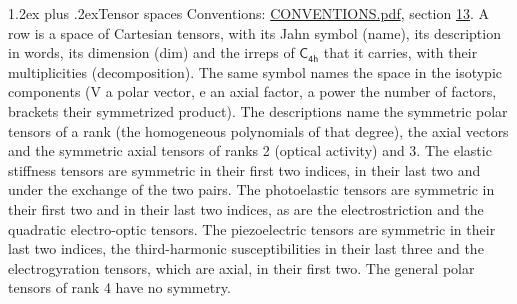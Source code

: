 \documentclass[10pt,a4paper]{article}
\makeatletter
\renewcommand\section{\@startsection{section}{1}{\z@}{-3ex plus -1ex minus -.2ex}%
  {1.2ex plus .2ex}{\normalfont\large\sffamily\bfseries\color{parttitle}}}
\numberwithin{equation}{section}
\newcommand{\grp}[1]{\mathsf{#1}}
\makeatother
\begin{document}
\section{Tensor spaces}\label{s:tensor_spaces}
Conventions: \href{../../CONVENTIONS.pdf}{CONVENTIONS.pdf}, section \href{../../CONVENTIONS.pdf\#conv.13}{13}.
\leavevmode\label{n:head.name}\label{n:head.description}\label{n:head.dim}\label{n:head.decomposition}A row is a space of Cartesian tensors, with its Jahn symbol (name), its description in words, its dimension (dim) and the irreps of $\grp{C_{4h}}$ that it carries, with their multiplicities (decomposition). \label{n:label.jahn}The same symbol names the space in the isotypic components (V a polar vector, e an axial factor, a power the number of factors, brackets their symmetrized product). The descriptions name the symmetric polar tensors of a rank (the homogeneous polynomials of that degree), the axial vectors and the symmetric axial tensors of ranks 2 (optical activity) and 3. The elastic stiffness tensors are symmetric in their first two indices, in their last two and under the exchange of the two pairs. The photoelastic tensors are symmetric in their first two and in their last two indices, as are the electrostriction and the quadratic electro-optic tensors. The piezoelectric tensors are symmetric in their last two indices, the third-harmonic susceptibilities in their last three and the electrogyration tensors, which are axial, in their first two. The general polar tensors of rank 4 have no symmetry.
\end{document}
